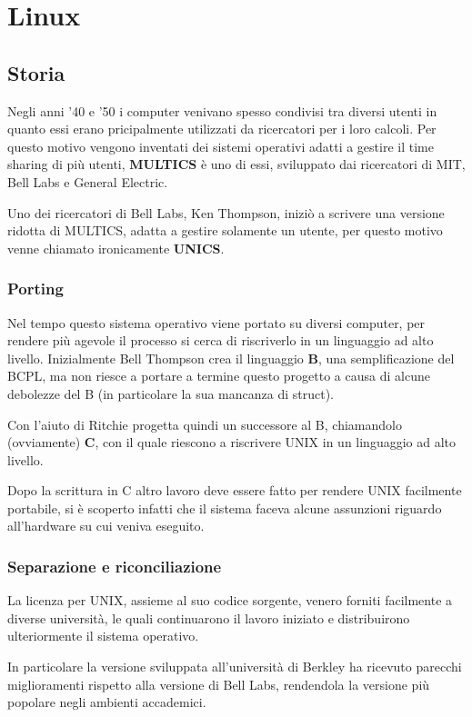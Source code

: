 \section{Linux}
\subsection{Storia}
Negli anni '40 e '50 i computer venivano spesso condivisi tra diversi utenti in quanto essi erano pricipalmente utilizzati da ricercatori per i loro calcoli.
Per questo motivo vengono inventati dei sistemi operativi adatti a gestire il time sharing di più utenti, \textbf{MULTICS} è uno di essi, sviluppato dai ricercatori di MIT, Bell Labs e General Electric.

\spacer
Uno dei ricercatori di Bell Labs, Ken Thompson, iniziò a scrivere una versione ridotta di MULTICS, adatta a gestire solamente un utente, per questo motivo venne chiamato ironicamente \textbf{UNICS}.

\subsubsection{Porting}
Nel tempo questo sistema operativo viene portato su diversi computer, per rendere più agevole il processo si cerca di riscriverlo in un linguaggio ad alto livello.
Inizialmente Bell Thompson crea il linguaggio \textbf{B}, una semplificazione del BCPL, ma non riesce a portare a termine questo progetto a causa di alcune debolezze del B (in particolare la sua mancanza di struct).

Con l'aiuto di Ritchie progetta quindi un successore al B, chiamandolo (ovviamente) \textbf{C}, con il quale riescono a riscrivere UNIX in un linguaggio ad alto livello.

Dopo la scrittura in C altro lavoro deve essere fatto per rendere UNIX facilmente portabile, si è scoperto infatti che il sistema faceva alcune assunzioni riguardo all'hardware su cui veniva eseguito.

\subsubsection{Separazione e riconciliazione}
La licenza per UNIX, assieme al suo codice sorgente, venero forniti facilmente a diverse università, le quali continuarono il lavoro iniziato e distribuirono ulteriormente il sistema operativo.

In particolare la versione sviluppata all'università di Berkley ha ricevuto parecchi miglioramenti rispetto alla versione di Bell Labs, rendendola la versione più popolare negli ambienti accademici.

